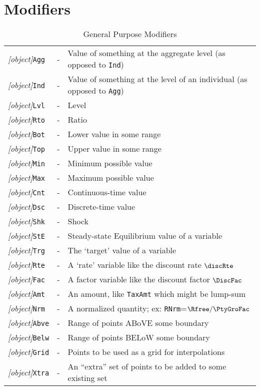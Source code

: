 \documentclass[12pt]{\econtex}
\begin{document}
\section{Modifiers}
\begin{table}[ht]
  \centering
  \begin{tabular}{|>{\ttfamily}lcl|}
    \hline
    \textit{[object]}\texttt{Agg} & - & Value of something at the aggregate level (as opposed to \texttt{Ind})
    \\ \textit{[object]}\texttt{Ind} & - & Value of something at the level of an individual (as opposed to \texttt{Agg})
    \\ \textit{[object]}\texttt{Lvl} & - & Level
    \\ \textit{[object]}\texttt{Rto} & - & Ratio
    \\ \textit{[object]}\texttt{Bot} & - & Lower value in some range
    \\ \textit{[object]}\texttt{Top} & - & Upper value in some range
    \\ \textit{[object]}\texttt{Min} & - & Minimum possible value
    \\ \textit{[object]}\texttt{Max} & - & Maximum possible value
    \\ \textit{[object]}\texttt{Cnt} & - & Continuous-time value
    \\ \textit{[object]}\texttt{Dsc} & - & Discrete-time value
    \\ \textit{[object]}\texttt{Shk} & - & Shock
    \\ \textit{[object]}\texttt{StE} & - & Steady-state Equilibrium value of a variable
    \\ \textit{[object]}\texttt{Trg} & - & The `target' value of a variable
    \\ \textit{[object]}\texttt{Rte} & - & A `rate' variable like the discount rate $\discRte$
    \\ \textit{[object]}\texttt{Fac} & - & A factor variable like the discount factor $\DiscFac$
    \\ \textit{[object]}\texttt{Amt} & - & An amount, like \texttt{TaxAmt} which might be lump-sum
    \\ \textit{[object]}\texttt{Nrm} & - & A normalized quantity; ex: \texttt{RNrm}=$\Rfree/\PtyGroFac$
    \\ \textit{[object]}\texttt{Abve} & - & Range of points ABoVE some boundary
    \\ \textit{[object]}\texttt{Belw} & - & Range of points BELoW some boundary
    \\ \textit{[object]}\texttt{Grid} & - & Points to be used as a grid for interpolations
    \\ \textit{[object]}\texttt{Xtra} & - & An ``extra'' set of points to be added to some existing set \\ \hline
  \end{tabular}
  \caption{General Purpose Modifiers}
  \label{table:General}
\end{table}
\end{document}
